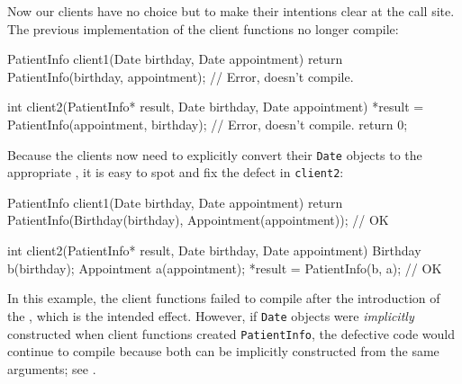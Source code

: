 \noindent Now our clients have no choice but to make their intentions clear at the
call site. The previous implementation of the client functions no longer compile:

\begin{emcppslisting}[emcppsbatch=e6,emcppserrorlines={1,2,4}]
PatientInfo client1(Date birthday, Date appointment)
{
    return PatientInfo(birthday, appointment);     // Error, doesn't compile.
}

int client2(PatientInfo* result, Date birthday, Date appointment)
{
    *result = PatientInfo(appointment, birthday);  // Error, doesn't compile.
    return 0;
}
\end{emcppslisting}
Because the clients now need to explicitly convert their \lstinline!Date! objects to the appropriate , it is easy to spot and fix the defect in \lstinline!client2!:
\begin{emcppslisting}[emcppsbatch=e7]
PatientInfo client1(Date birthday, Date appointment)
{
    return PatientInfo(Birthday(birthday), Appointment(appointment));  // OK
}

int client2(PatientInfo* result, Date birthday, Date appointment)
{
    Birthday b(birthday);
    Appointment a(appointment);
    *result = PatientInfo(b, a);  // OK
}
\end{emcppslisting}

\noindent
In this example, the client functions failed to compile after the introduction of the , which is the intended effect. However, if \lstinline!Date! objects were \emph{implicitly} constructed when client functions created \lstinline!PatientInfo!, the defective code would continue to compile because both  can be implicitly constructed from the same arguments; see .

